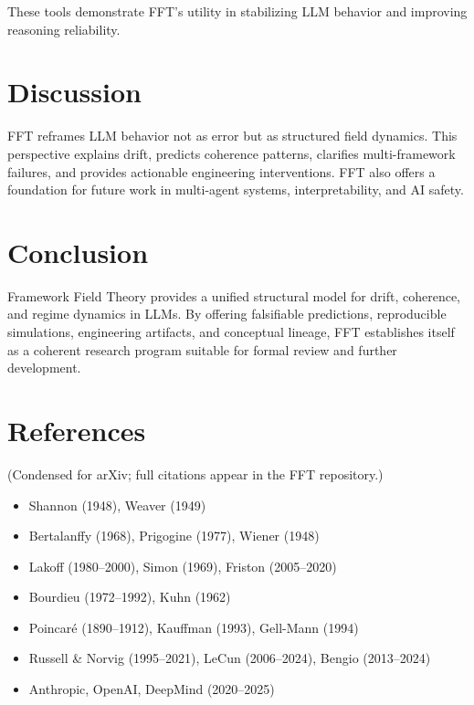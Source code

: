 \documentclass[11pt]{article}
\begin{document}
These tools demonstrate FFT's utility in stabilizing LLM behavior and improving reasoning reliability.

\section{Discussion}

FFT reframes LLM behavior not as error but as structured field dynamics. This perspective explains drift, predicts coherence patterns, clarifies multi-framework failures, and provides actionable engineering interventions. FFT also offers a foundation for future work in multi-agent systems, interpretability, and AI safety.

\section{Conclusion}

Framework Field Theory provides a unified structural model for drift, coherence, and regime dynamics in LLMs. By offering falsifiable predictions, reproducible simulations, engineering artifacts, and conceptual lineage, FFT establishes itself as a coherent research program suitable for formal review and further development.

\section*{References}

(Condensed for arXiv; full citations appear in the FFT repository.)

\begin{itemize}
    \item Shannon (1948), Weaver (1949)
    \item Bertalanffy (1968), Prigogine (1977), Wiener (1948)
    \item Lakoff (1980--2000), Simon (1969), Friston (2005--2020)
    \item Bourdieu (1972--1992), Kuhn (1962)
    \item Poincar\'e (1890--1912), Kauffman (1993), Gell-Mann (1994)
    \item Russell \& Norvig (1995--2021), LeCun (2006--2024), Bengio (2013--2024)
    \item Anthropic, OpenAI, DeepMind (2020--2025)
\end{itemize}
\end{document}

